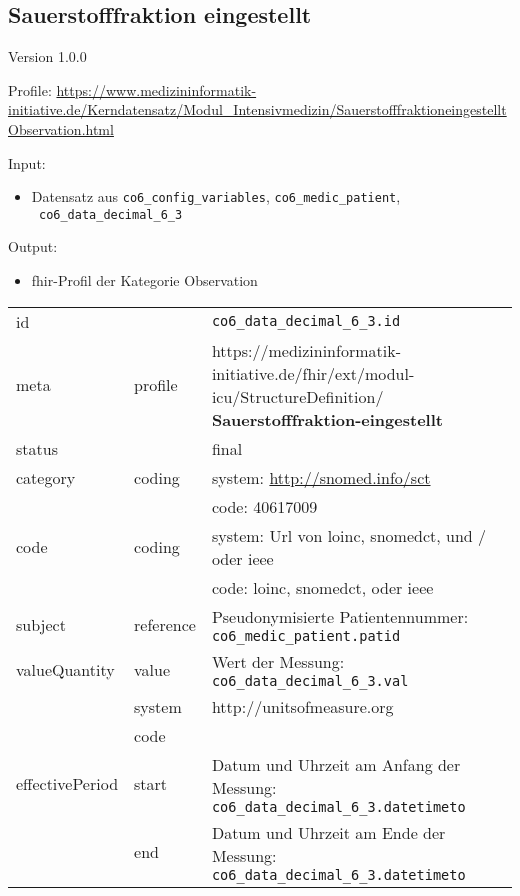 \subsection{Sauerstofffraktion eingestellt} 
\noindent Version 1.0.0

\noindent Profile: \url{https://www.medizininformatik-initiative.de/Kerndatensatz/Modul_Intensivmedizin/SauerstofffraktioneingestelltObservation.html}

\noindent Input:
\begin{itemize}
	\item Datensatz aus \texttt{co6\_config\_variables}, \texttt{co6\_medic\_patient}, \\ \texttt{
co6\_data\_decimal\_6\_3}
\end{itemize}
Output:
\begin{itemize}
        \item \ac{fhir}-Profil der Kategorie \glqq Observation\grqq{}
\end{itemize}
\begin{longtable}{|l|l|p{7.5cm}|}
        \hline
        \rowcolor{lightgray} \multicolumn{3}{|l|}{Data Mapping (inhaltlich)} \\ \hline
        id &  & \texttt{co6\_data\_decimal\_6\_3.id} \\ \hline
	meta & profile & https://medizininformatik-initiative.de/fhir/ext/modul-icu/StructureDefinition/\textbf{
Sauerstofffraktion-eingestellt} \\ \hline 
	status &  & final  \\ \hline 
	category & coding & system: \url{http://snomed.info/sct} \\
\cline{3-3}
	& & code: 40617009 \\ \hline
	code & coding & system: Url von \ac{loinc}, \ac{snomedct}, und / oder \ac{ieee} \\ 
	\cline{3-3} 
	 &  & code: \ac{loinc}, \ac{snomedct}, oder \ac{ieee} \\ \hline
	subject & reference & Pseudonymisierte Patientennummer: \texttt{co6\_medic\_patient.patid} \\ \hline
	valueQuantity & value & Wert der Messung: \texttt{
co6\_data\_decimal\_6\_3.val} \\
        \cline{2-3}
         & system & http://unitsofmeasure.org \\
         \cline{2-3}
         & code & \\ \hline
    effectivePeriod & start & Datum und Uhrzeit am Anfang der Messung: \texttt{
co6\_data\_decimal\_6\_3.datetimeto} \\
    \cline{2-3}
     & end & Datum und Uhrzeit am Ende der Messung: \texttt{
co6\_data\_decimal\_6\_3.datetimeto} \\ \hline
\end{longtable}


